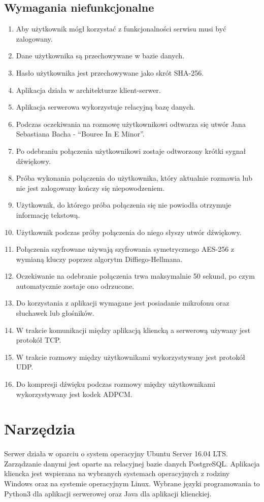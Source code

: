 \documentclass{article}
\begin{document}
  \subsection{Wymagania niefunkcjonalne}
  \begin{enumerate}
    \item Aby użytkownik mógł korzystać z funkcjonalności serwisu musi być zalogowany.
    \item Dane użytkownika są przechowywane w bazie danych.
    \item Hasło użytkownika jest przechowywane jako skrót SHA-256.
    \item Aplikacja działa w architekturze klient-serwer.
    \item Aplikacja serwerowa wykorzystuje relacyjną bazę danych.
    \item Podczas oczekiwania na rozmowę użytkownikowi odtwarza się utwór Jana Sebastiana Bacha - “Bouree In E Minor”.
    \item Po odebraniu połączenia użytkownikowi zostaje odtworzony krótki sygnał dźwiękowy.
    \item Próba wykonania połączenia do użytkownika, który aktualnie rozmawia lub nie jest zalogowany kończy się niepowodzeniem.
    \item Użytkownik, do którego próba połączenia się nie powiodła otrzymuje informację tekstową.
    \item Użytkownik podczas próby połączenia do niego słyszy utwór dźwiękowy.
    \item Połączenia szyfrowane używają szyfrowania symetrycznego AES-256 z wymianą kluczy poprzez algorytm Diffiego-Hellmana.
    \item Oczekiwanie na odebranie połączenia trwa maksymalnie 50 sekund, po czym automatycznie zostaje ono odrzucone.
    \item Do korzystania z aplikacji wymagane jest posiadanie mikrofonu oraz słuchawek lub głośników.
    \item W trakcie komunikacji między aplikacją kliencką a serwerową używany jest protokół TCP.
    \item W trakcie rozmowy między użytkownikami wykorzystywany jest protokół UDP.
    \item Do kompresji dźwięku podczas rozmowy między użytkownikami wykorzystywany jest kodek ADPCM.
  \end{enumerate}
  \section{Narzędzia}
  \paragraph{}Serwer działa w oparciu o system operacyjny Ubuntu Server 16.04 LTS. Zarządzanie danymi jest oparte na relacyjnej bazie danych PostgreSQL. Aplikacja kliencka jest wspierana na wybranych systemach operacyjnych z rodziny Windows oraz na systemie operacyjnym Linux. Wybrane języki programowania to Python3 dla aplikacji serwerowej oraz Java dla aplikacji klienckiej.
\end{document}
